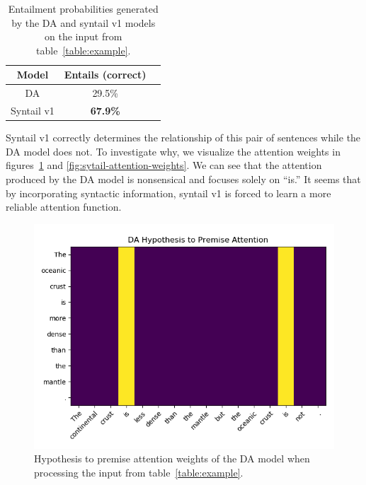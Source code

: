 \documentclass[11pt,a4paper]{article}
\begin{document}
\begin{table}[htb]
  \centering
  \begin{tabular}{c c c}
    \toprule
    Model & Entails (correct) \\
    \midrule
    DA & 29.5\% \\
    Syntail v1 & \textbf{67.9\%} \\
    \bottomrule
  \end{tabular}
  \caption{Entailment probabilities generated by the DA and syntail v1 models
      on the input from table~\ref{table:example}.}
\label{table:pred-example}
\end{table}

Syntail v1 correctly determines the relationship of this pair of sentences
while the DA model does not.  To investigate why, we visualize the attention
weights in figures~\ref{fig:da-attention-weights} and
\ref{fig:sytail-attention-weights}.  We can see that the attention produced by
the DA model is nonsensical and focuses solely on ``is.'' It seems that by
incorporating syntactic information, syntail v1 is forced to learn a more
reliable attention function.

\begin{figure}[htb]
  \centering
  \includegraphics[width=\linewidth]{figures/da-h2p-attention.png}
  \caption{Hypothesis to premise attention weights of the DA model when
      processing the input from table~\ref{table:example}.}
\label{fig:da-attention-weights}
\end{figure}
\end{document}
